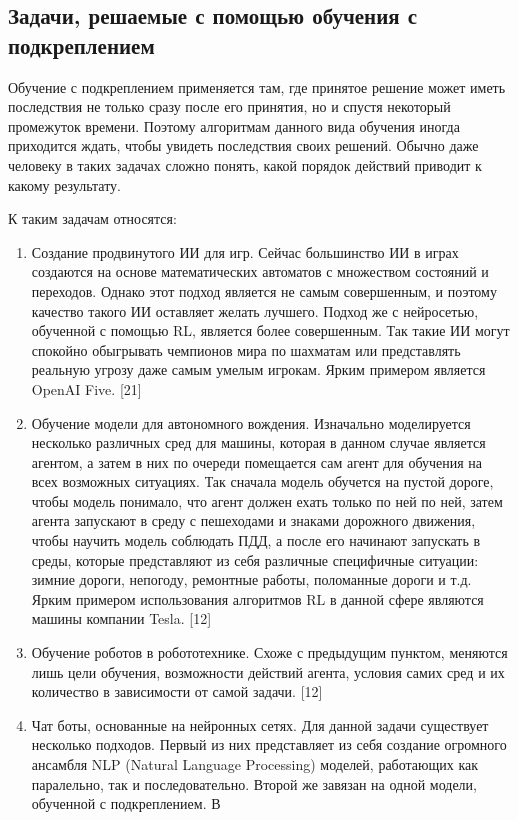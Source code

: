 \documentclass[bachelor, och, coursework]{shiza}
\begin{document}
\subsection{Задачи, решаемые с помощью обучения с подкреплением}
Обучение с подкреплением применяется там, где принятое решение может иметь последствия не только сразу после его принятия,
но и спустя некоторый промежуток времени. Поэтому алгоритмам данного вида обучения иногда приходится ждать, чтобы
увидеть последствия своих решений. Обычно даже человеку в таких задачах сложно понять, какой порядок действий приводит к
какому результату.

К таким задачам относятся:
\begin{enumerate}
    \item Создание продвинутого ИИ для игр. Сейчас большинство ИИ в играх создаются на основе математических автоматов с множеством состояний
    и переходов. Однако этот подход является не самым совершенным, и поэтому качество такого ИИ оставляет желать лучшего. Подход же с нейросетью,
    обученной с помощью RL, является более совершенным. Так такие ИИ могут спокойно обыгрывать чемпионов мира по шахматам или представлять реальную
    угрозу даже самым умелым игрокам. Ярким примером является OpenAI Five. [21]
    \item Обучение модели для автономного вождения. Изначально моделируется несколько различных сред для машины, которая в данном случае является агентом,
    а затем в них по очереди помещается сам агент для обучения на всех возможных ситуациях. Так сначала модель обучется на пустой дороге, чтобы модель понимало,
    что агент должен ехать только по ней по ней, затем агента запускают в среду с пешеходами и знаками дорожного движения, чтобы научить модель соблюдать ПДД,
    а после его начинают запускать в среды, которые представляют из себя различные специфичные ситуации: зимние дороги, непогоду, ремонтные работы, поломанные
    дороги и т.д. Ярким примером использования алгоритмов RL в данной сфере являются машины компании Tesla. [12]
    \item Обучение роботов в робототехнике. Схоже с предыдущим пунктом, меняются лишь цели обучения, возможности действий агента, условия самих сред и их количество
    в зависимости от самой задачи. [12]
    \item Чат боты, основанные на нейронных сетях. Для данной задачи существует несколько подходов. Первый из них представляет из себя создание огромного ансамбля
    NLP (Natural Language Processing) моделей, работающих как паралельно, так и последовательно. Второй же завязан на одной модели, обученной с подкреплением. В

\end{enumerate}
\end{document}
